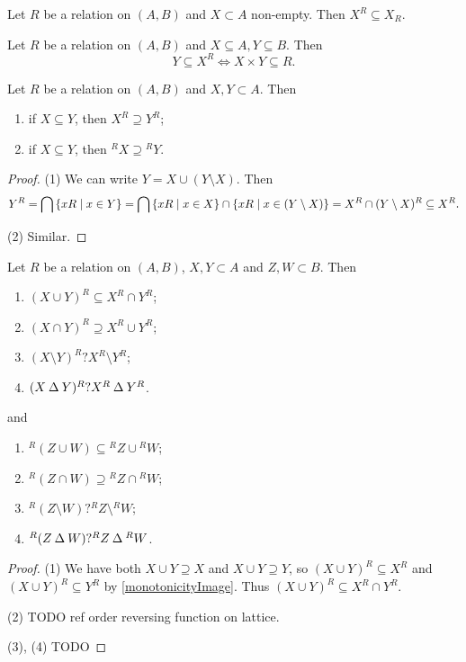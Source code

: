 \begin{lemma} \label{polarSubsetImage}
Let $R$ be a relation on $(A, B)$ and $X\subset A$ non-empty. Then $X^R \subseteq X_R$.
\end{lemma}

\begin{lemma} \label{polarsCartesianProduct}
Let $R$ be a relation on $(A,B)$ and $X\subseteq A, Y\subseteq B$. Then
\[ Y\subseteq X^R \iff X\times Y \subseteq R. \]
\end{lemma}

\begin{corollary} \label{antitonicityPolars}
Let $R$ be a relation on $(A, B)$ and $X,Y\subset A$. Then
\begin{enumerate}
\item if $X\subseteq Y$, then $X^R \supseteq Y^R$;
\item if $X\subseteq Y$, then ${^RX} \supseteq {^RY}$.
\end{enumerate}
\end{corollary}
\begin{proof}
(1) We can write $Y = X \cup (Y\setminus X)$. Then
\[ Y^R = \bigcap \left\{ xR \;\middle|\; x\in Y \right\} = \bigcap \left\{ xR \;\middle|\; x\in X \right\}\cap\left\{ xR \;\middle|\; x\in (Y\setminus X) \right\} = X^R \cap (Y\setminus X)^R \subseteq X^R. \]

(2) Similar.
\end{proof}
\begin{corollary} \label{polarasRelation}
Let $R$ be a relation on $(A, B)$, $X,Y\subset A$ and $Z,W\subset B$. Then
\begin{enumerate}
\item $(X\cup Y)^R \subseteq X^R\cap Y^R$;
\item $(X\cap Y)^R \supseteq X^R\cup Y^R$;
\item $(X\setminus Y)^R ? X^R\setminus Y^R$;
\item $(X\mathbin{\Delta} Y)^R ? X^R\mathbin{\Delta} Y^R$.
\end{enumerate}
and
\begin{enumerate}
\item $^R(Z\cup W) \subseteq {^RZ}\cup {^RW}$;
\item $^R(Z\cap W) \supseteq {^RZ}\cap {^RW}$;
\item $^R(Z\setminus W) ? {^RZ}\setminus {^RW}$;
\item $^R(Z\mathbin{\Delta} W) ? {^RZ}\mathbin{\Delta} {^RW}$.
\end{enumerate}
\end{corollary}
\begin{proof}\mbox{}
(1) We have both $X\cup Y \supseteq X$ and $X\cup Y \supseteq Y$, so $(X\cup Y)^R \subseteq X^R$ and $(X\cup Y)^R \subseteq Y^R$ by \ref{monotonicityImage}. Thus $(X\cup Y)^R \subseteq X^R\cap Y^R$.

(2) TODO ref order reversing function on lattice.

(3), (4) TODO
\end{proof}

